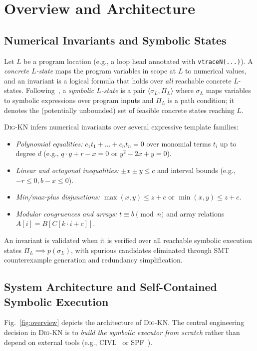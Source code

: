 \documentclass[runningheads]{llncs}
\newcommand{\tool}{\textsc{Dig-KN}\xspace}
\newcommand{\code}[1]{\texttt{\small #1}}
\begin{document}
\section{Overview and Architecture}
\label{sec:overview}

\subsection{Numerical Invariants and Symbolic States}
\label{sec:problem}
Let $L$ be a program location (e.g., a loop head annotated with \code{vtraceN(...)}).  A \emph{concrete $L$-state} maps the program variables in scope at $L$ to numerical values, and an invariant is a logical formula that holds over \emph{all} reachable concrete $L$-states.  Following~\cite{nguyen2021using}, a \emph{symbolic $L$-state} is a pair $\langle\sigma_L,\Pi_L\rangle$ where $\sigma_L$ maps variables to symbolic expressions over program inputs and $\Pi_L$ is a path condition; it denotes the (potentially unbounded) set of feasible concrete states reaching $L$.

\tool{} infers numerical invariants over several expressive template families:
\begin{itemize}[leftmargin=1.5em,itemsep=2pt]
\item \emph{Polynomial equalities:} $c_1 t_1 + \dots + c_n t_n = 0$ over monomial terms $t_i$ up to degree $d$ (e.g., $q\cdot y + r - x = 0$ or $y^2 - 2x + y = 0$).
\item \emph{Linear and octagonal inequalities:} $\pm x \pm y \le c$ and interval bounds (e.g., $-r \le 0, b - x \le 0$).
\item \emph{Min/max-plus disjunctions:} $\max(x, y) \le z + c$ or $\min(x, y) \le z + c$.
\item \emph{Modular congruences and arrays:} $t \equiv b \pmod n$ and array relations $A[i] = B[C[k\cdot i + c]]$.
\end{itemize}
An invariant is validated when it is verified over all reachable symbolic execution states $\Pi_L \implies p(\sigma_L)$, with spurious candidates eliminated through SMT counterexample generation and redundancy simplification.

\subsection{System Architecture and Self-Contained Symbolic Execution}
\label{sec:arch}
Fig.~\ref{fig:overview} depicts the architecture of \tool{}.  The central engineering decision in \tool{} is to \emph{build the symbolic executor from scratch} rather than depend on external tools (e.g., CIVL~\cite{siegel2015civl} or SPF~\cite{pasareanu2010spf}).
\end{document}
